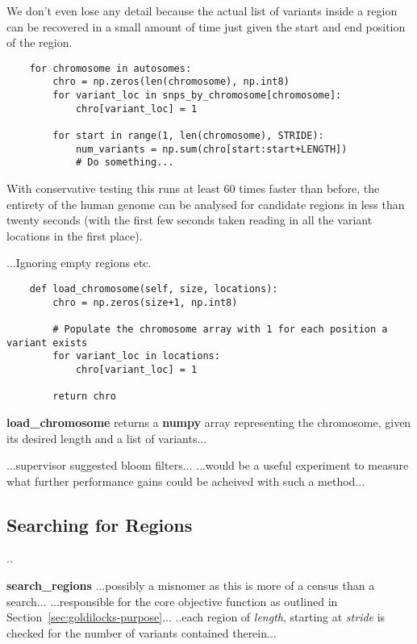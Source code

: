 We don’t even lose any detail because the actual list of variants inside a
region can be recovered in a small amount of time just given the start and end
position of the region.

\begin{verbatim}
    for chromosome in autosomes:
        chro = np.zeros(len(chromosome), np.int8)
        for variant_loc in snps_by_chromosome[chromosome]:
            chro[variant_loc] = 1

        for start in range(1, len(chromosome), STRIDE):
            num_variants = np.sum(chro[start:start+LENGTH])
            # Do something...
\end{verbatim}

With conservative testing this runs at least 60 times faster than before, the
entirety of the human genome can be analysed for candidate regions in less than
twenty seconds (with the first few seconds taken reading in all the variant
locations in the first place).

...Ignoring empty regions etc.

\begin{verbatim}
    def load_chromosome(self, size, locations):
        chro = np.zeros(size+1, np.int8)

        # Populate the chromosome array with 1 for each position a variant exists
        for variant_loc in locations:
            chro[variant_loc] = 1

        return chro
\end{verbatim}

\textbf{load\_chromosome} returns a \textbf{numpy} array representing the
chromosome, given its desired length and a list of variants...

...supervisor suggested bloom filters...
...would be a useful experiment to measure what further performance gains could
be acheived with such a method...


\subsection{Searching for Regions}

..


\textbf{search\_regions}
...possibly a misnomer as this is more of a census than a search...
...responsible for the core objective function as outlined in
Section~\ref{sec:goldilocks-purpose}...
..each region of \textit{length}, starting at \textit{stride} is checked for the
number of variants contained therein...

